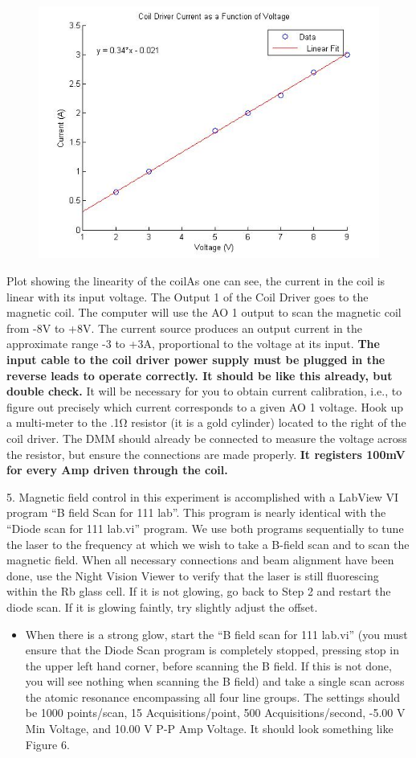 \documentclass{../lab}
\begin{document}
\begin{figure}[h]
    \centering
    \href{http://experimentationlab.berkeley.edu/sites/default/files/images/Voltagecurrentplot.jpg}{\includegraphics[width=0.5\linewidth]{images/Voltagecurrentplot.jpg}}
    \caption{}
    \label{fig:Voltagecurrentplot}
\end{figure}


Plot showing the linearity of the coilAs one can see, the current in the coil is linear with its input voltage. The Output 1 of the Coil Driver goes to the magnetic coil. The computer will use the AO 1 output to scan the magnetic coil from -8V to +8V. The current source produces an output current in the approximate range -3 to +3A, proportional to the voltage at its input. \textbf{The input cable to the coil driver power supply must be plugged in the reverse leads to operate correctly. It should be like this already, but double check.} It will be necessary for you to obtain current calibration, i.e., to figure out precisely which current corresponds to a given AO 1 voltage. Hook up a multi-meter to the .1Ω resistor (it is a gold cylinder) located to the right of the coil driver. The DMM should already be connected to measure the voltage across the resistor, but ensure the connections are made properly. \textbf{It registers 100mV for every Amp driven through the coil.}

5. Magnetic field control in this experiment is accomplished with a LabView VI program ``B field Scan for 111 lab''. This program is nearly identical with the ``Diode scan for 111 lab.vi'' program. We use both programs sequentially to tune the laser to the frequency at which we wish to take a B-field scan and to scan the magnetic field. When all necessary connections and beam alignment have been done, use the Night Vision Viewer to verify that the laser is still fluorescing within the Rb glass cell. If it is not glowing, go back to Step 2 and restart the diode scan. If it is glowing faintly, try slightly adjust the offset.

\begin{itemize}
    \item When there is a strong glow, start the ``B field scan for 111 lab.vi'' (you must ensure that the Diode Scan program is completely stopped, pressing stop in the upper left hand corner, before scanning the B field. If this is not done, you will see nothing when scanning the B field) and take a single scan across the atomic resonance encompassing all four line groups. The settings should be 1000 points/scan, 15 Acquisitions/point, 500 Acquisitions/second, -5.00 V Min Voltage, and 10.00 V P-P Amp Voltage. It should look something like Figure 6.

\end{itemize}
\end{document}
